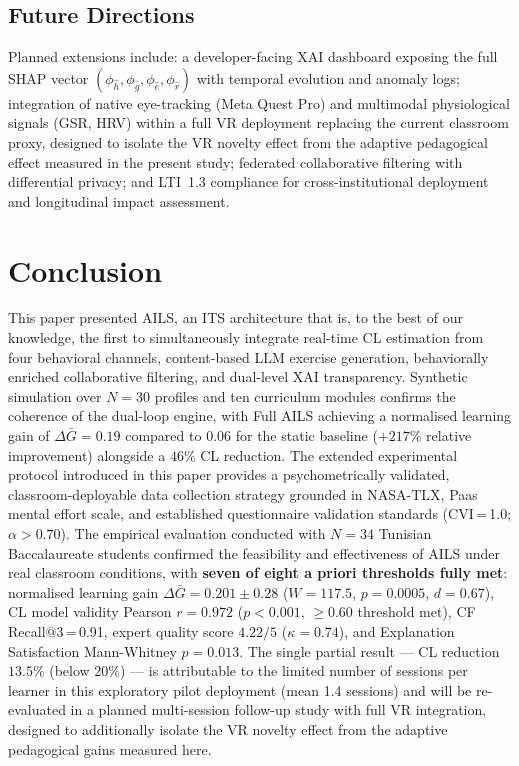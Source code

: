 \documentclass[ASNA,twocolumn]{USG} %
\begin{document}
\subsection{Future Directions}
\label{sec:perspectives}

Planned extensions include: a developer-facing XAI dashboard
exposing the full SHAP vector
$(\phi_{\hat{h}}, \phi_{\hat{g}}, \phi_{\hat{e}}, \phi_{\hat{r}})$
with temporal evolution and anomaly logs; integration of native
eye-tracking (Meta Quest Pro) and multimodal physiological signals
(GSR, HRV) within a full VR deployment replacing the current
classroom proxy, designed to isolate the VR novelty effect from the
adaptive pedagogical effect measured in the present study; federated
collaborative filtering with differential privacy; and LTI~1.3
compliance for cross-institutional deployment and longitudinal impact
assessment.

\section{Conclusion}
\label{sec:conclusion}

This paper presented AILS, an ITS architecture that is, to the best
of our knowledge, the first to simultaneously integrate real-time CL
estimation from four behavioral channels, content-based LLM exercise
generation, behaviorally enriched collaborative filtering, and
dual-level XAI transparency.
Synthetic simulation over $N{=}30$ profiles and ten curriculum
modules confirms the coherence of the dual-loop engine, with Full
AILS achieving a normalised learning gain of $\Delta\bar{G}{=}0.19$
compared to $0.06$ for the static baseline ($+217\%$ relative
improvement) alongside a $46\%$ CL reduction.
The extended experimental protocol introduced in this paper provides
a psychometrically validated, classroom-deployable data collection
strategy grounded in NASA-TLX, Paas mental effort scale, and
established questionnaire validation standards (CVI\,=\,1.0;
$\alpha > 0.70$). The empirical evaluation conducted with $N{=}34$
Tunisian Baccalaureate students confirmed the feasibility and
effectiveness of AILS under real classroom conditions, with
\textbf{seven of eight a priori thresholds fully met}: normalised
learning gain $\Delta\bar{G}{=}0.201{\pm}0.28$ ($W{=}117.5$,
$p{=}0.0005$, $d{=}0.67$), CL model validity Pearson $r{=}0.972$
($p{<}0.001$, $\geq 0.60$ threshold met), CF Recall@3\,=\,0.91,
expert quality score $4.22/5$ ($\kappa{=}0.74$), and Explanation
Satisfaction Mann-Whitney $p{=}0.013$.
The single partial result --- CL reduction $13.5\%$ (below $20\%$)
--- is attributable to the limited number of sessions per learner
in this exploratory pilot deployment (mean 1.4 sessions) and will
be re-evaluated in a planned multi-session follow-up study with full
VR integration, designed to additionally isolate the VR novelty
effect from the adaptive pedagogical gains measured here.
\end{document}
